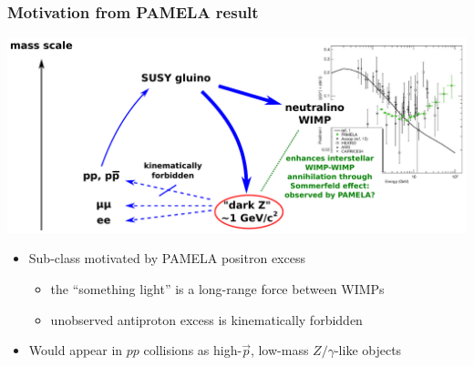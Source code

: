\documentclass[compress]{beamer}
\begin{document}
\begin{frame}
\frametitle{Motivation from PAMELA result}
\includegraphics[width=\linewidth]{basic_picture2.pdf}

\vspace{0.5 cm}
\begin{itemize}
\item Sub-class motivated by PAMELA positron excess
\begin{itemize}
\item the ``something light'' is a long-range force between WIMPs
\item unobserved antiproton excess is kinematically forbidden
\end{itemize}
\item Would appear in $pp$ collisions as high-$\vec{p}$, low-mass $Z/\gamma$-like objects
\end{itemize}
\end{frame}
\end{document}
